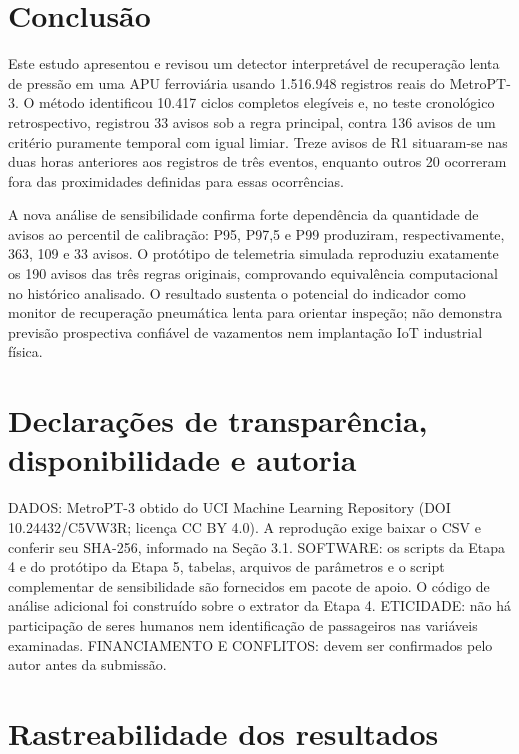 \documentclass[conference]{IEEEtran}
\begin{document}
\section{Conclusão}

Este estudo apresentou e revisou um detector interpretável de recuperação lenta de pressão em uma APU ferroviária usando 1.516.948 registros reais do MetroPT-3. O método identificou 10.417 ciclos completos elegíveis e, no teste cronológico retrospectivo, registrou 33 avisos sob a regra principal, contra 136 avisos de um critério puramente temporal com igual limiar. Treze avisos de R1 situaram-se nas duas horas anteriores aos registros de três eventos, enquanto outros 20 ocorreram fora das proximidades definidas para essas ocorrências.

A nova análise de sensibilidade confirma forte dependência da quantidade de avisos ao percentil de calibração: P95, P97,5 e P99 produziram, respectivamente, 363, 109 e 33 avisos. O protótipo de telemetria simulada reproduziu exatamente os 190 avisos das três regras originais, comprovando equivalência computacional no histórico analisado. O resultado sustenta o potencial do indicador como monitor de recuperação pneumática lenta para orientar inspeção; não demonstra previsão prospectiva confiável de vazamentos nem implantação IoT industrial física.

\section*{Declarações de transparência, disponibilidade e autoria}

DADOS: MetroPT-3 obtido do UCI Machine Learning Repository (DOI 10.24432/C5VW3R; licença CC BY 4.0). A reprodução exige baixar o CSV e conferir seu SHA-256, informado na Seção 3.1. SOFTWARE: os scripts da Etapa 4 e do protótipo da Etapa 5, tabelas, arquivos de parâmetros e o script complementar de sensibilidade são fornecidos em pacote de apoio. O código de análise adicional foi construído sobre o extrator da Etapa 4. ETICIDADE: não há participação de seres humanos nem identificação de passageiros nas variáveis examinadas. FINANCIAMENTO E CONFLITOS: devem ser confirmados pelo autor antes da submissão.

\appendices
\section{Rastreabilidade dos resultados}
\end{document}
